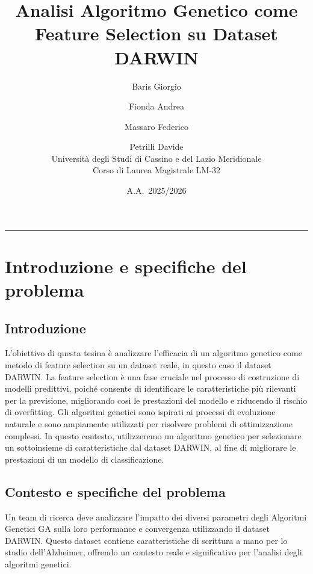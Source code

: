 \documentclass[11pt,a4paper]{article}
\title{
  \vspace{-1cm}
  {\Large \textbf{Analisi Algoritmo Genetico come Feature Selection 
su Dataset DARWIN}}
}
\author{Baris Giorgio \and Fionda Andrea \and Massaro Federico \and Petrilli Davide \\ [0.5cm]
  \small Università degli Studi di Cassino e del Lazio Meridionale\\
  \small Corso di Laurea Magistrale LM-32
}
\date{A.A.\ 2025/2026}
\begin{document}
\maketitle
\thispagestyle{fancy}
\tableofcontents
\vspace{0.4cm}
\rule{\linewidth}{0.3pt}
\bigskip

\section{Introduzione e specifiche del problema}
\subsection{Introduzione}
L'obiettivo di questa tesina è analizzare l'efficacia di un algoritmo genetico come metodo di feature selection su un dataset reale, in questo caso il dataset DARWIN. La feature selection è una fase cruciale nel processo di costruzione di modelli predittivi, poiché consente di identificare le caratteristiche più rilevanti per la previsione, migliorando così le prestazioni del modello e riducendo il rischio di overfitting.
Gli algoritmi genetici sono ispirati ai processi di evoluzione naturale e sono ampiamente utilizzati per risolvere problemi di ottimizzazione complessi. In questo contesto, utilizzeremo un algoritmo genetico per selezionare un sottoinsieme di caratteristiche dal dataset DARWIN, al fine di migliorare le prestazioni di un modello di classificazione.
\subsection{Contesto e specifiche del problema}
Un team di ricerca deve analizzare l'impatto dei diversi parametri degli
Algoritmi Genetici GA sulla loro performance e convergenza utilizzando il
dataset DARWIN. Questo dataset contiene caratteristiche di scrittura a mano
per lo studio dell'Alzheimer, offrendo un contesto reale e significativo per
l'analisi degli algoritmi genetici.
\end{document}
